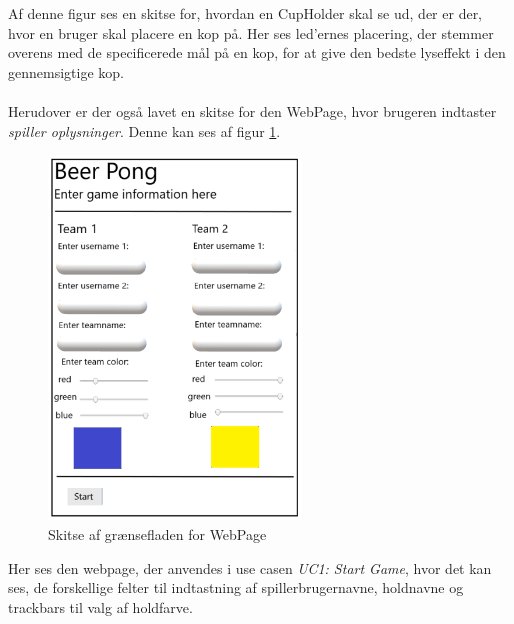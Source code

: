 \documentclass[Rapport/Rapport_main.tex]{subfiles}
\begin{document}
Af denne figur ses en skitse for, hvordan en CupHolder skal se ud, der er der, hvor en bruger skal placere en kop på. Her ses led'ernes placering, der stemmer overens med de specificerede mål på en kop, for at give den bedste lyseffekt i den gennemsigtige kop.\\\\
Herudover er der også lavet en skitse for den WebPage, hvor brugeren indtaster \textit{spiller oplysninger}. Denne kan ses af figur \ref{fig:rap_webpage_sketch}.

\begin{figure}[H]
    \centering
    \includegraphics[width=0.6\textwidth]{Kravspecifikation/Ikke-funktionelle/graphics/WebPage_IF.png}
    \caption{Skitse af grænsefladen for WebPage}
   \label{fig:rap_webpage_sketch}
\end{figure}

Her ses den webpage, der anvendes i use casen \textit{UC1: Start Game}, hvor det kan ses, de forskellige felter til indtastning af spillerbrugernavne, holdnavne og trackbars til valg af holdfarve.
\end{document}
